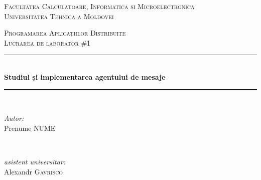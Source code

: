\begin{titlepage}

  \begin{center} %

  \textsc{\large Facultatea Calculatoare, Informatica si Microelectronica}\\[0.5cm]
  \textsc{\large Universitatea Tehnica a Moldovei}\\[1.2cm] %
  \vspace{25 mm}

  \textsc{\large Programarea Aplicațiilor Distribuite}\\[0.5cm] %
  \textsc{\large Lucrarea de laborator \#1}\\[0.5cm] %

\newcommand{\HRule}{\rule{\linewidth}{0.5mm}} %

  \vspace{10 mm}
  \HRule \\[0.4cm]
  { \LARGE \bfseries Studiul și implementarea agentului de mesaje}\\[0.4cm] %
  \HRule \\[1.5cm]

      \vspace{30mm}

      \begin{minipage}{0.4\textwidth}
      \begin{flushleft} \large
      \emph{Autor:}\\
      Prenume \textsc{NUME}
      \end{flushleft}
      \end{minipage}
      ~
      \begin{minipage}{0.4\textwidth}
      \begin{flushright} \large
      \emph{asistent universitar:} \\
      Alexandr \textsc{Gavrișco} \\ %
      \end{flushright}
      \end{minipage}\\[4cm]


\end{center}
\end{titlepage}
